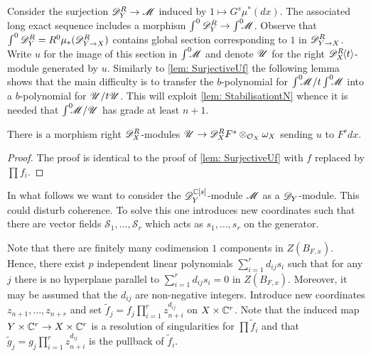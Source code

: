 Consider the surjection $\mathscr{D}_Y^R\to \mathscr{M}$ induced by $1\mapsto G^s \mu^*(dx)$.
The associated long exact sequence includes a morphism $\int^0 \mathscr{D}_Y^R \to \int^0 \mkern -8mu\mathscr{M}$.
Observe that $\int^0 \mathscr{D}_Y^R = R^0\mu_*(\mathscr{D}_{Y\to X}^R)$ contains global section corresponding to $1$ in $\mathscr{D}_{Y\to X}^R$.
Write $u$ for the image of this section in $\int^0 \mkern -8mu \mathscr{M}$ and denote $\mathscr{U}$ for the right $\mathscr{D}_X^R\mkern-5mu\left\langle t \right\rangle$-module generated by $u$.
Similarly to \cref{lem: SurjectiveUf} the following lemma shows that the main difficulty is to transfer the $b$-polynomial for $\int^0 \mkern -8mu\mathscr{M}/t\int^0 \mkern -8mu\mathscr{M}$ into a $b$-polynomial for $\mathscr{U}/t\mathscr{U}$.
This will exploit \cref{lem: StabilisationtN} whence it is needed that $\int^0 \mkern -8mu\mathscr{M} /\mathscr{U}$ has grade at least $n+1$.\\
\begin{lemma}\label{lem: SurjectionUF}
  There is a morphism right $\mathscr{D}_X^R$-modules $\mathscr{U}\to \mathscr{D}_X^RF^s \otimes_{\mathcal{O}_X}\omega_X$ sending $u$ to $F^sdx$.
\end{lemma}
\begin{proof}
   The proof is identical to the proof of \cref{lem: SurjectiveUf} with $f$ replaced by $\prod f_i$.
\end{proof}

In what follows we want to consider the $\mathscr{D}_Y^{\mathbb{C}[s]}$-module $\mathscr{M}$ as a $\mathscr{D}_Y$-module.
This could disturb coherence.
To solve this one introduces new coordinates such that there are vector fields $\mathcal{S}_1,\ldots, \mathcal{S}_r$ which acts as $s_1,\ldots,s_r$ on the generator.

Note that there are finitely many codimension $1$ components in $Z(B_{F,x})$.
Hence, there exist $p$ independent linear polynomials $\sum_{i=1}^r d_{ij}s_i$ such that for any $j$ there is no hyperplane parallel to $\sum_{i=1}^r d_{ij}s_i = 0$ in $Z(B_{F,x})$.
Moreover, it may be assumed that the $d_{ij}$ are non-negative integers.
Introduce new coordinates $z_{n+1}, \ldots,z_{n+r}$ and set $\widetilde{f}_j = f_j\prod_{i=1}^r z_{n+i}^{d_{ij}}$ on $X\times \mathbb{C}^r$.
Note that the induced map $Y\times \mathbb{C}^r \to X\times \mathbb{C}^r$ is a resolution of singularities for $\prod \widetilde{f}_i$ and that $\widetilde{g}_j = g_j\prod_{i=1}^r z_{n+i}^{d_{ij}}$ is the pullback of $\widetilde{f}_i$.

